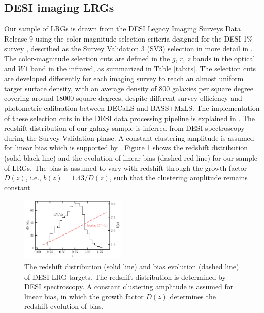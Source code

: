 \subsection{DESI imaging LRGs}
Our sample of LRGs is drawn from the DESI Legacy Imaging Surveys Data Release 9 \citep[DR9;][]{dey2018overview} using the color-magnitude selection criteria designed for the DESI 1\% survey \citep{desi2023sv}, described as the Survey Validation 3 (SV3) selection in more detail in \cite{zhou2022target}. The color-magnitude selection cuts are defined in the $g$, $r$, $z$ bands in the optical and $W1$ band in the infrared, as summarized in Table \ref{tab:ts}. The selection cuts are developed differently for each imaging survey to reach an almost uniform target surface density, with an average density of $800$ galaxies per square degree covering around $18000$ square degrees, despite different survey efficiency and photometric calibration between DECaLS and BASS+MzLS. The implementation of these selection cuts in the DESI data processing pipeline is explained in \cite{myers2022}. The redshift distribution of our galaxy sample is inferred from DESI spectroscopy during the Survey Validation phase. A constant clustering amplitude is assumed for linear bias which is supported by \cite{zhou2021clustering}. Figure \ref{fig:nz} shows the redshift distribution (solid black line) and the evolution of linear bias (dashed red line) for our sample of LRGs. The bias is assumed to vary with redshift through the growth factor $D(z)$, i.e., $b(z)=1.43/D(z)$, such that the clustering amplitude remains constant \citep[see, e.g.,][]{zhou2021clustering}.

\begin{figure}
 \centering
 \includegraphics[width=0.45\textwidth]{figures/nz_lrg.pdf}
 \caption{The redshift distribution (solid line) and bias evolution (dashed line) of DESI LRG targets. The redshift distribution is determined by DESI spectroscopy. A constant clustering amplitude is assumed for linear bias, in which the growth factor $D(z)$ determines the redshift evolution of bias.}
 \label{fig:nz}
\end{figure}

